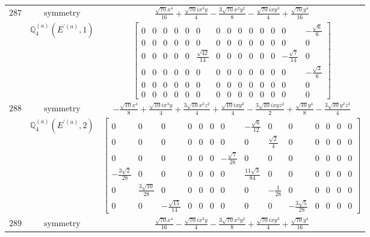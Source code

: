 \documentclass[fleqn,8pt,landscape]{jsarticle}
\begin{document}
\begin{longtable}{ccc}
$ 287 $ & $ \text{symmetry} $ & $ \frac{\sqrt{70} x^{4}}{16} + \frac{\sqrt{70} i x^{3} y}{4} - \frac{3 \sqrt{70} x^{2} y^{2}}{8} - \frac{\sqrt{70} i x y^{3}}{4} + \frac{\sqrt{70} y^{4}}{16} $ \\
$  $ & $ \mathbb{Q}_{4}^{(a)}(E^{\prime(a)},1) $ & $ \begin{bmatrix} 0 & 0 & 0 & 0 & 0 & 0 & 0 & 0 & 0 & 0 & 0 & 0 & 0 & - \frac{\sqrt{6}}{6} \\ 0 & 0 & 0 & 0 & 0 & 0 & 0 & 0 & 0 & 0 & 0 & 0 & 0 & 0 \\ 0 & 0 & 0 & 0 & 0 & \frac{\sqrt{42}}{14} & 0 & 0 & 0 & 0 & 0 & 0 & - \frac{\sqrt{7}}{14} & 0 \\ 0 & 0 & 0 & 0 & 0 & 0 & 0 & 0 & 0 & 0 & 0 & 0 & 0 & - \frac{\sqrt{3}}{6} \\ 0 & 0 & 0 & 0 & 0 & 0 & 0 & 0 & 0 & 0 & 0 & 0 & 0 & 0 \\ 0 & 0 & 0 & 0 & 0 & 0 & 0 & 0 & 0 & 0 & 0 & 0 & 0 & 0 \end{bmatrix} $ \\ \hline
$ 288 $ & $ \text{symmetry} $ & $ - \frac{\sqrt{10} x^{4}}{8} + \frac{\sqrt{10} i x^{3} y}{4} + \frac{3 \sqrt{10} x^{2} z^{2}}{4} + \frac{\sqrt{10} i x y^{3}}{4} - \frac{3 \sqrt{10} i x y z^{2}}{2} + \frac{\sqrt{10} y^{4}}{8} - \frac{3 \sqrt{10} y^{2} z^{2}}{4} $ \\
$  $ & $ \mathbb{Q}_{4}^{(a)}(E^{\prime(a)},2) $ & $ \begin{bmatrix} 0 & 0 & 0 & 0 & 0 & 0 & 0 & - \frac{\sqrt{6}}{12} & 0 & 0 & 0 & 0 & 0 & 0 \\ 0 & 0 & 0 & 0 & 0 & 0 & 0 & 0 & \frac{\sqrt{2}}{4} & 0 & 0 & 0 & 0 & 0 \\ 0 & 0 & 0 & 0 & 0 & 0 & - \frac{\sqrt{7}}{28} & 0 & 0 & 0 & 0 & 0 & 0 & 0 \\ - \frac{3 \sqrt{2}}{28} & 0 & 0 & 0 & 0 & 0 & 0 & \frac{11 \sqrt{3}}{84} & 0 & 0 & 0 & 0 & 0 & 0 \\ 0 & \frac{3 \sqrt{10}}{28} & 0 & 0 & 0 & 0 & 0 & 0 & - \frac{1}{28} & 0 & 0 & 0 & 0 & 0 \\ 0 & 0 & - \frac{\sqrt{15}}{14} & 0 & 0 & 0 & 0 & 0 & 0 & - \frac{3 \sqrt{5}}{28} & 0 & 0 & 0 & 0 \end{bmatrix} $ \\ \hline
$ 289 $ & $ \text{symmetry} $ & $ \frac{\sqrt{70} x^{4}}{16} - \frac{\sqrt{70} i x^{3} y}{4} - \frac{3 \sqrt{70} x^{2} y^{2}}{8} + \frac{\sqrt{70} i x y^{3}}{4} + \frac{\sqrt{70} y^{4}}{16} $ \\

\end{longtable}
\end{document}
